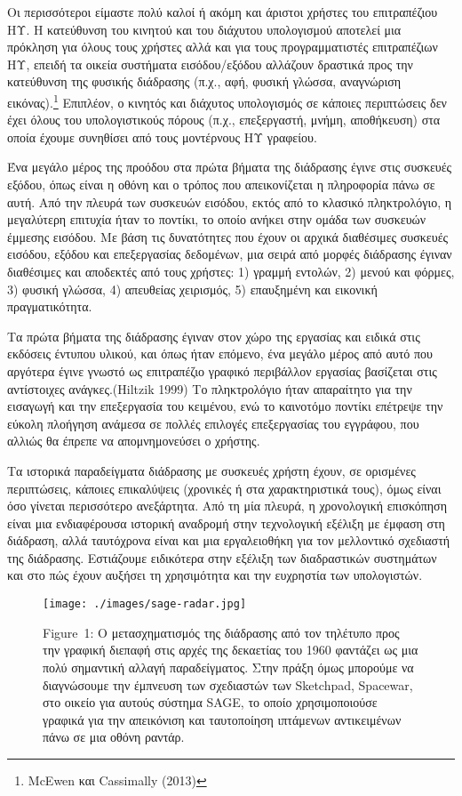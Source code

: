 \documentclass[
]{article}
\begin{document}
Οι περισσότεροι είμαστε πολύ καλοί ή ακόμη και άριστοι χρήστες του
επιτραπέζιου ΗΥ. Η κατεύθυνση του κινητού και του διάχυτου υπολογισμού
αποτελεί μια πρόκληση για όλους τους χρήστες αλλά και για τους
προγραμματιστές επιτραπέζιων ΗΥ, επειδή τα οικεία συστήματα
εισόδου/εξόδου αλλάζουν δραστικά προς την κατεύθυνση της φυσικής
διάδρασης (π.χ., αφή, φυσική γλώσσα, αναγνώριση εικόνας).\footnote{McEwen
  και Cassimally (2013)} Επιπλέον, ο κινητός και διάχυτος υπολογισμός σε
κάποιες περιπτώσεις δεν έχει όλους του υπολογιστικούς πόρους (π.χ.,
επεξεργαστή, μνήμη, αποθήκευση) στα οποία έχουμε συνηθίσει από τους
μοντέρνους ΗΥ γραφείου.

Ένα μεγάλο μέρος της προόδου στα πρώτα βήματα της διάδρασης έγινε στις
συσκευές εξόδου, όπως είναι η οθόνη και ο τρόπος που απεικονίζεται η
πληροφορία πάνω σε αυτή. Από την πλευρά των συσκευών εισόδου, εκτός από
το κλασικό πληκτρολόγιο, η μεγαλύτερη επιτυχία ήταν το ποντίκι, το οποίο
ανήκει στην ομάδα των συσκευών έμμεσης εισόδου. Με βάση τις δυνατότητες
που έχουν οι αρχικά διαθέσιμες συσκευές εισόδου, εξόδου και επεξεργασίας
δεδομένων, μια σειρά από μορφές διάδρασης έγιναν διαθέσιμες και
αποδεκτές από τους χρήστες: 1) γραμμή εντολών, 2) μενού και φόρμες, 3)
φυσική γλώσσα, 4) απευθείας χειρισμός, 5) επαυξημένη και εικονική
πραγματικότητα.

Τα πρώτα βήματα της διάδρασης έγιναν στον χώρο της εργασίας και ειδικά
στις εκδόσεις έντυπου υλικού, και όπως ήταν επόμενο, ένα μεγάλο μέρος
από αυτό που αργότερα έγινε γνωστό ως επιτραπέζιο γραφικό περιβάλλον
εργασίας βασίζεται στις αντίστοιχες ανάγκες.(Hiltzik 1999) Το
πληκτρολόγιο ήταν απαραίτητο για την εισαγωγή και την επεξεργασία του
κειμένου, ενώ το καινοτόμο ποντίκι επέτρεψε την εύκολη πλοήγηση ανάμεσα
σε πολλές επιλογές επεξεργασίας του εγγράφου, που αλλιώς θα έπρεπε να
απομνημονεύσει ο χρήστης.

Τα ιστορικά παραδείγματα διάδρασης με συσκευές χρήστη έχουν, σε
ορισμένες περιπτώσεις, κάποιες επικαλύψεις (χρονικές ή στα
χαρακτηριστικά τους), όμως είναι όσο γίνεται περισσότερο ανεξάρτητα. Από
τη μία πλευρά, η χρονολογική επισκόπηση είναι μια ενδιαφέρουσα ιστορική
αναδρομή στην τεχνολογική εξέλιξη με έμφαση στη διάδραση, αλλά
ταυτόχρονα είναι και μια εργαλειοθήκη για τον μελλοντικό σχεδιαστή της
διάδρασης. Εστιάζουμε ειδικότερα στην εξέλιξη των διαδραστικών
συστημάτων και στο πώς έχουν αυξήσει τη χρησιμότητα και την ευχρηστία
των υπολογιστών.

\leavevmode{}%
\begin{figure}
\hypertarget{fig:sage-radar}{%
\centering
\texttt{[image: ./images/sage-radar.jpg]}
\caption{Figure~1: Ο μετασχηματισμός της διάδρασης από τον τηλέτυπο προς
την γραφική διεπαφή στις αρχές της δεκαετίας του 1960 φαντάζει ως μια
πολύ σημαντική αλλαγή παραδείγματος. Στην πράξη όμως μπορούμε να
διαγνώσουμε την έμπνευση των σχεδιαστών των Sketchpad, Spacewar, στο
οικείο για αυτούς σύστημα SAGE, το οποίο χρησιμοποιούσε γραφικά για την
απεικόνιση και ταυτοποίηση ιπτάμενων αντικειμένων πάνω σε μια οθόνη
ραντάρ.}\label{fig:sage-radar}
}
\end{figure}
\end{document}
